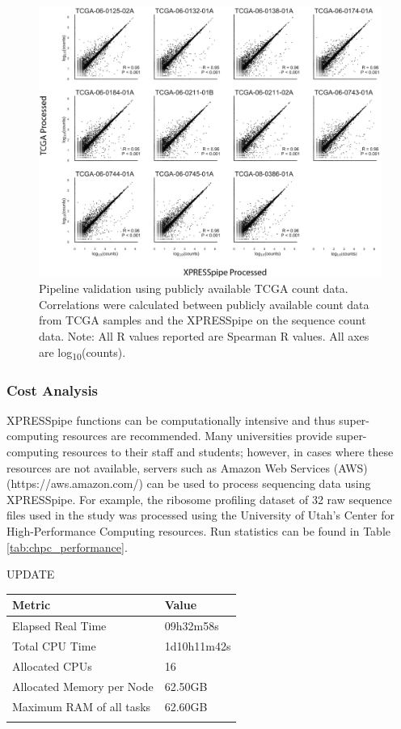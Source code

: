 \documentclass[11pt, a4paper, oneside]{article}
\begin{document}
\begin{figure}
\centering
  \includegraphics[width=180mm]{figures/xpresspipe_figure4.png}
  \caption{Pipeline validation using publicly available TCGA count data. Correlations were calculated between publicly available count data from TCGA samples and the XPRESSpipe on the sequence count data. Note: All R values reported are Spearman R values. All axes are log\textsubscript{10}(counts).}
  \label{fig:figure4}
\end{figure}


\subsubsection{Cost Analysis}
XPRESSpipe functions can be computationally intensive and thus super-computing resources are recommended. Many universities provide super-computing resources to their staff and students; however, in cases where these resources are not available, servers such as Amazon Web Services (AWS) (https://aws.amazon.com/) can be used to process sequencing data using XPRESSpipe. For example, the ribosome profiling dataset of 32 raw sequence files used in the study was processed using the University of Utah's Center for High-Performance Computing resources. Run statistics can be found in Table \ref{tab:chpc_performance}.

UPDATE
\begin{tabular}{p{5cm}p{3cm}}
\textbf{Metric} & \textbf{Value} \\
\hline
 Elapsed Real Time & 09h32m58s \\
 \hline
 Total CPU Time & 1d10h11m42s  \\
 \hline
 Allocated CPUs & 16 \\
 \hline
 Allocated Memory per Node & 62.50GB \\
 \hline
 Maximum RAM of all tasks & 62.60GB \\
 \label{tab:chpc_performance}
\end{tabular}
\newline
\end{document}

